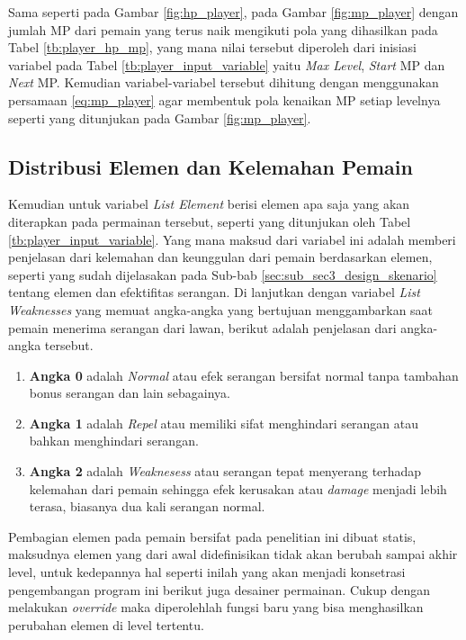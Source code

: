 Sama seperti pada Gambar \ref{fig:hp_player}, pada Gambar \ref{fig:mp_player} dengan jumlah MP dari pemain yang terus naik mengikuti pola yang dihasilkan pada Tabel \ref{tb:player_hp_mp}, yang mana nilai tersebut diperoleh dari inisiasi variabel pada Tabel \ref{tb:player_input_variable} yaitu \textit{Max Level}, \textit{Start} MP dan \textit{Next} MP. Kemudian variabel-variabel tersebut dihitung dengan menggunakan persamaan \ref{eq:mp_player} agar membentuk pola kenaikan MP setiap levelnya seperti yang ditunjukan pada Gambar \ref{fig:mp_player}.
\vspace{1ex}

\subsection{Distribusi Elemen dan Kelemahan Pemain}
\label{sec:sub_sec3_list_element_player}
\vspace{1ex}

Kemudian untuk variabel \textit{List Element} berisi elemen apa saja yang akan diterapkan pada permainan tersebut, seperti yang ditunjukan oleh Tabel \ref{tb:player_input_variable}. Yang mana maksud dari variabel ini adalah memberi penjelasan dari kelemahan dan keunggulan dari pemain berdasarkan elemen, seperti yang sudah dijelasakan pada Sub-bab \ref{sec:sub_sec3_design_skenario} tentang elemen dan efektifitas serangan. Di lanjutkan dengan variabel \textit{List Weaknesses} yang memuat angka-angka yang bertujuan menggambarkan saat pemain menerima serangan dari lawan, berikut adalah penjelasan dari angka-angka tersebut.

\begin{enumerate}[label=\alph*).]
	\item \textbf{Angka 0} adalah \textit{Normal} atau efek serangan bersifat normal tanpa tambahan bonus serangan dan lain sebagainya.
	
	\item \textbf{Angka 1} adalah \textit{Repel} atau memiliki sifat menghindari serangan atau bahkan menghindari serangan.
	
	\item \textbf{Angka 2} adalah \textit{Weaknesess} atau serangan tepat menyerang terhadap kelemahan dari pemain sehingga efek kerusakan atau \textit{damage} menjadi lebih terasa, biasanya dua kali serangan normal.
\end{enumerate}

Pembagian elemen pada pemain bersifat pada penelitian ini dibuat statis, maksudnya elemen yang dari awal didefinisikan tidak akan berubah sampai akhir level, untuk kedepannya hal seperti inilah yang akan menjadi konsetrasi pengembangan program ini berikut juga desainer permainan. Cukup dengan melakukan \textit{override} maka diperolehlah fungsi baru yang bisa menghasilkan perubahan elemen di level tertentu.
\vspace{1ex}

